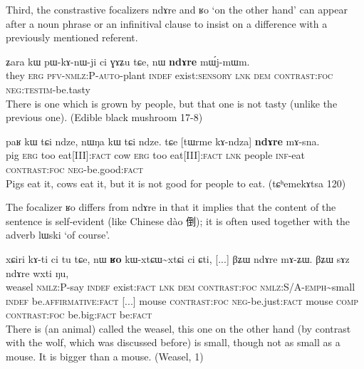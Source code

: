 \documentclass[oldfontcommands,oneside,a4paper,11pt]{article}
\newcommand{\ipa}[1]{{\phon \mbox{#1}}} %
\newcommand{\zh}[1]{{\cn #1}}
\begin{document}
Third, the constrastive focalizers \ipa{ndɤre}  and \ipa{ʁo}  `on the other hand' can appear after a noun phrase or an infinitival clause to insist on a difference with a previously mentioned referent.


\begin{exe}
\ex \label{ex:ndAre.mWjmWm}
\gll
\ipa{ʑara}  	\ipa{kɯ}  	\ipa{pɯ-kɤ-nɯ-ji}  	\ipa{ci}  	\ipa{ɣɤʑu}  	\ipa{tɕe,}  	\ipa{nɯ}  	\ipa{\textbf{ndɤre}}  	\ipa{mɯ́j-mɯm.}  \\
they \textsc{erg} \textsc{pfv-nmlz:P-auto}-plant \textsc{indef} exist:\textsc{sensory} \textsc{lnk} \textsc{dem} \textsc{contrast:foc} \textsc{neg:testim}-be.tasty \\
\glt There is one which is grown by people, but that one is not tasty (unlike the previous one). (Edible black mushroom 17-8)
\end{exe}

\begin{exe}
\ex \label{ex:ndAre.mAsna}
\gll
\ipa{paʁ}    	\ipa{kɯ}    	\ipa{tɕi}    	\ipa{ndze,}    	\ipa{nɯŋa}    	\ipa{kɯ}    	\ipa{tɕi}    	\ipa{ndze.}    	\ipa{tɕe}    	[\ipa{tɯrme}    	\ipa{kɤ-ndza}]    	\ipa{\textbf{ndɤre}}    	\ipa{mɤ-sna.}    \\
pig \textsc{erg} too eat[III]:\textsc{fact} cow  \textsc{erg} too eat[III]:\textsc{fact} \textsc{lnk} people \textsc{inf}-eat  \textsc{contrast:foc}  \textsc{neg}-be.good:\textsc{fact} \\
\glt Pigs eat it, cows eat it, but it is not good for people to eat. (\ipa{tɕʰemekɤtsa} 120)
\end{exe}

The focalizer \ipa{ʁo} differs from \ipa{ndɤre} in that it implies that the content of the sentence is self-evident (like Chinese \ipa{dào} \zh{倒}); it is often used together with the adverb \ipa{lɯski} `of course'.

\begin{exe}
\ex \label{ex:Ro.ndAre}
\gll
\ipa{xɕiri}    	\ipa{kɤ-ti}    	\ipa{ci}    	\ipa{tu}    	\ipa{tɕe,}    	\ipa{nɯ}    	\ipa{\textbf{ʁo}}    	\ipa{kɯ-xtɕɯ\textasciitilde{}xtɕi}    	\ipa{ci}    	\ipa{ɕti,}    	 [...] 	\ipa{βʑɯ}    	\ipa{ndɤre}    	\ipa{mɤ-ʑɯ.}    	\ipa{βʑɯ}    	\ipa{sɤz}    	\ipa{ndɤre}    	\ipa{wxti}    	\ipa{ŋu,}   \\
weasel \textsc{nmlz:P}-say \textsc{indef} exist:\textsc{fact} \textsc{lnk} \textsc{dem} \textsc{contrast:foc} \textsc{nmlz:S/A-emph}\textasciitilde{}small \textsc{indef} be.\textsc{affirmative}:\textsc{fact} [...] mouse \textsc{contrast:foc} \textsc{neg}-be.just:\textsc{fact} mouse \textsc{comp} \textsc{contrast:foc} be.big:\textsc{fact} be:\textsc{fact} \\
\glt There is (an animal) called the weasel, this one on the other hand (by contrast with the wolf, which was discussed before) is small, though not as small as a mouse. It is bigger than a mouse. (Weasel, 1)
\end{exe}
\end{document}
